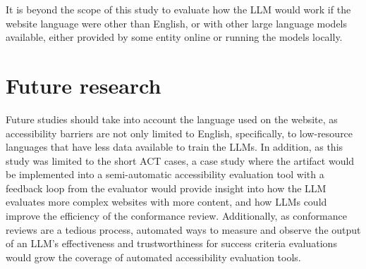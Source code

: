 It is beyond the scope of this study to evaluate how the LLM would work if the website language were other than English, or with other large language models available, either provided by some entity online or running the models locally.

\section{Future research}

Future studies should take into account the language used on the website, as accessibility barriers are not only limited to English, specifically, to low-resource languages that have less data available to train the LLMs. In addition, as this study was limited to the short ACT cases, a case study where the artifact would be implemented into a semi-automatic accessibility evaluation tool with a feedback loop from the evaluator would provide insight into how the LLM evaluates more complex websites with more content, and how LLMs could improve the efficiency of the conformance review. Additionally, as conformance reviews are a tedious process, automated ways to measure and observe the output of an LLM's effectiveness and trustworthiness for success criteria evaluations would grow the coverage of automated accessibility evaluation tools.

